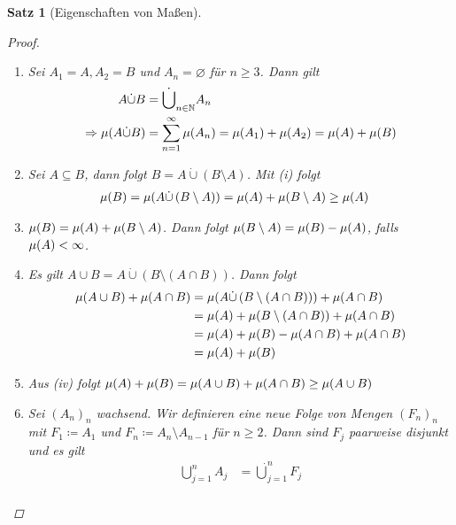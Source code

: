 \documentclass[11pt, twoside, a4paper]{article}
\theoremstyle{plain}
\newtheorem{satz}[blockelement]{Satz}
\numberwithin{equation}{subsection}
\newcommand{\pair}[1]{\left(#1\right)}
\newcommand{\of}[1]{\mathopen{}\mathclose{}\bgroup\left(#1\aftergroup\egroup\right)}
\newcommand{\impl}[0]{\Rightarrow{}}
\newcommand{\exclude}[0]{\setminus}
\renewcommand{\emptyset}{\varnothing}
\newcommand{\theoremescape}{\leavevmode}
\newcommand{\N}{\mathbb{N}}
\begin{document}
\begin{satz}[Eigenschaften von Maßen]
        \begin{proof}
            \theoremescape
            \begin{enumerate}[label=(\roman*)]
                \item Sei $A_1 = A, A_2 = B$ und $A_n = \emptyset$ für $n\geq 3$. Dann gilt
                \begin{align*}
                    A \dot\cup B &= \dot\bigcup_{n\in\N} A_n\\
                    \impl \mu\of{A\dot\cup B} &= \sum_{n=1}^{\infty} \mu\of{A_n} = \mu\of{A_1} + \mu\of{A_2} = \mu\of{A} + \mu\of{B}
                \end{align*}
                \item Sei $A \subseteq B$, dann folgt $B = A \dot\cup \pair{B\exclude A}$. Mit (i) folgt
                \begin{align*}
                    \mu\of{B} &= \mu\of{A \dot\cup \pair{B\exclude A}} = \mu\of{A} + \mu\of{B\exclude A} \geq \mu\of{A}
                \end{align*}
                \item $\mu\of{B} = \mu\of{A} + \mu\of{B\exclude A}$. Dann folgt $\mu\of{B\exclude A} = \mu\of{B} - \mu\of{A}$, falls $\mu\of{A} < \infty$.
                \item Es gilt $A \cup B = A \dot\cup \pair{B\exclude\pair{A \cap B}}$. Dann folgt
                \begin{align*}
                    \mu\of{A \cup B} + \mu\of{A\cap B} &= \mu\of{A\dot\cup\pair{B\exclude\pair{A\cap B}}} + \mu\of{A \cap B}\\
                    &= \mu\of{A} + \mu\of{B\exclude \pair{A\cap B}} + \mu\of{A \cap B}\\
                    &= \mu\of{A} + \mu\of{B} - \mu\of{A \cap B} + \mu\of{A \cap B}\\
                    &= \mu\of{A} + \mu\of{B}
                \end{align*}
                \item Aus (iv) folgt $\mu\of{A} + \mu\of{B} = \mu\of{A\cup B} + \mu\of{A \cap B} \geq \mu\of{A \cup B}$
                \item Sei $(A_n)_n$ wachsend. Wir definieren eine neue Folge von Mengen $(F_n)_n$ mit $F_1 \coloneqq A_1$ und $F_n \coloneqq A_n \setminus A_{n-1}$ für $n\geq 2$. Dann sind $F_j$ paarweise disjunkt und es gilt
                \begin{align*}
                    \bigcup_{j=1}^{n} A_j &= \dot\bigcup_{j=1}^{n} F_j\\

\end{align*}
\end{enumerate}
\end{proof}
\end{satz}
\end{document}
